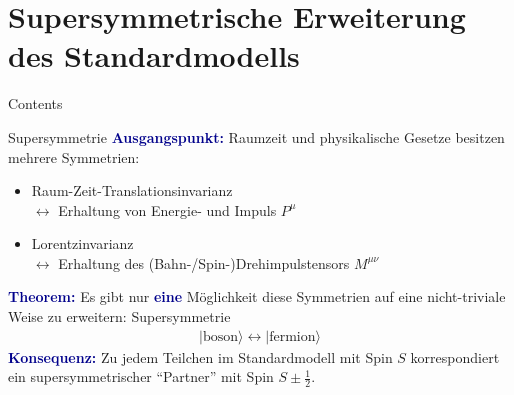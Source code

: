 \documentclass[hyperref={pdfpagelabels=false},ngerman]{beamer}
\renewcommand{\emph}[1]{\textbf{\textcolor{darkblue}{#1}}}
\begin{document}

\section{Supersymmetrische Erweiterung des Standardmodells}

\begin{frame}{Contents}
\end{frame}



\begin{frame}{Supersymmetrie}
  \emph{Ausgangspunkt:} Raumzeit und physikalische Gesetze besitzen
  mehrere Symmetrien:
  \begin{itemize}
  \item Raum-Zeit-Translationsinvarianz\\
    $\leftrightarrow$ Erhaltung von Energie- und Impuls $P^\mu$
  \item Lorentzinvarianz\\
    $\leftrightarrow$ Erhaltung des (Bahn-/Spin-)Drehimpulstensors $M^{\mu\nu}$
  \end{itemize}
  \vspace*{1em}
  \emph{Theorem:} Es gibt nur \emph{eine} Möglichkeit diese Symmetrien
  auf eine nicht-triviale Weise zu erweitern: Supersymmetrie
  \begin{align*}
    |\text{boson}\rangle \leftrightarrow |\text{fermion}\rangle
  \end{align*}
  \emph{Konsequenz:} Zu jedem Teilchen im Standardmodell mit Spin $S$
  korrespondiert ein supersymmetrischer ``Partner'' mit Spin
  $S \pm \frac{1}{2}$.
\end{frame}
\end{document}
